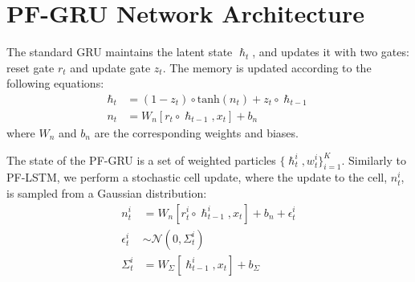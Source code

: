 \documentclass[letterpaper]{article} %
\begin{document}
\section{PF-GRU Network Architecture}\label{sec:pfgru}
The standard GRU maintains the latent state $\hslash_t$, and updates it with two gates: reset gate $r_t$ and update gate $z_t$. The memory is updated according to the following equations:
\begin{align*}
\hslash_t &= (1 - z_t)\circ \mathrm{tanh}(n_t) + z_t\circ \hslash_{t-1}\\
n_t &= W_n[r_t\circ \hslash_{t-1}, x_t] + b_n
\end{align*}
where $W_n$ and $b_n$ are the corresponding weights and biases.

The state of the PF-GRU is a set of weighted particles $\{\hslash_t^i, w_t^i\}_{i=1}^K$. Similarly to PF-LSTM, we perform a stochastic cell update, where the update to the cell, $n_t^i$, is sampled from a Gaussian distribution:
\begin{align*}
n_t^i &= W_n[r_t^i\circ \hslash_{t-1}^i, x_t] + b_n + \epsilon_t^i\\
\epsilon_t^i&\sim \mathcal{N}(0, \Sigma_t^i)\\
\Sigma_t^i &= W_\Sigma[\hslash_{t-1}^i, x_t] + b_\Sigma
\end{align*}
\end{document}
